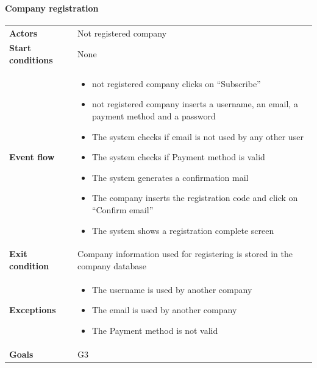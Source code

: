 \paragraph{Company registration}
\begin{center}
\begin{table}[H]
\centering
\begin{tabular}{l|p{}}
\textbf{Actors} & Not registered company \\
\textbf{Start conditions} & None \\


\textbf{Event flow}  & \begin{minipage}[t]{0.7\textwidth}
    \begin{itemize}
        \item not registered company clicks on “Subscribe”
\item not registered company inserts a username, an email, a payment method and a password
\item The system checks if email is not used by any other user
\item The system checks if Payment method is valid
\item The system generates a confirmation mail
\item The company inserts the registration code and click on “Confirm email”
\item The system shows a registration complete screen
    \end{itemize}
    
\end{minipage}\\ 

\textbf{Exit condition} & Company information used for registering is stored in the company database \\
\textbf{Exceptions} & \begin{minipage}[t]{0.7\textwidth}
    \begin{itemize}
        \item The username is used by another company
\item The email is used by another company
\item The Payment method is not valid

    \end{itemize}
    
\end{minipage}\\
\textbf{Goals} & G3 
\end{tabular}

\end{table}
\end{center}

